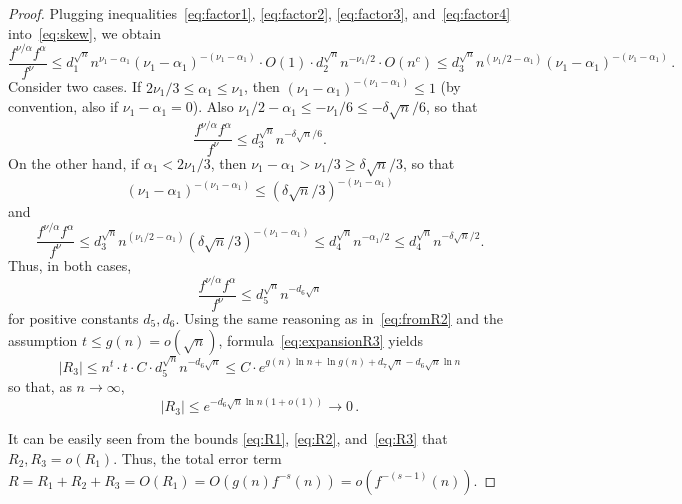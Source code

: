 \documentclass[12pt]%
{amsart}
\newcommand{\al}{{\alpha}}
\def\red#1{{\color{red}{#1}}}
\theoremstyle{plain}
\theoremstyle{definition}
\theoremstyle{remark}
\newcommand{\ve}{\varepsilon}
\begin{document}
\begin{proof}
Plugging inequalities~\eqref{eq:factor1}, \eqref{eq:factor2}, \eqref{eq:factor3}, and~\eqref{eq:factor4} into~\eqref{eq:skew}, we obtain
\[
    \frac{f^{\nu/\al} f^\al}{f^\nu}
    \le d_1^{\sqrt n}n^{\nu_1-\al_1}(\nu_1-\al_1)^{-(\nu_1-\al_1)}
    \cdot O(1) 
    \cdot d_2^{\sqrt n} n^{-\nu_1/2}
    \cdot O(n^c)
    \le d_3^{\sqrt n} n^{(\nu_1/2-\al_1)} (\nu_1-\al_1)^{-(\nu_1-\al_1)}\, .
\]
Consider two cases. 
If $2\nu_1/3\le\al_1 \le \nu_1$, then 
$(\nu_1-\al_1)^{-(\nu_1-\al_1)} \le 1$ (by convention, also if $\nu_1 - \al_1 = 0$).
Also $\nu_1/2-\al_1 \le -\nu_1/6 \le - \delta \sqrt n/6$, so that
\[
    \frac{f^{\nu/\al} f^\al}{f^\nu}
    \le d_3^{\sqrt n} n^{-\delta \sqrt n/6}.
\]
On the other hand, if $\al_1<2\nu_1/3$, then $\nu_1-\al_1 > \nu_1/3 \ge \delta \sqrt n/3$, so that
\[
    (\nu_1-\al_1)^{-(\nu_1-\al_1)}
    \le (\delta \sqrt n/3)^{-(\nu_1-\al_1)}
\]
and
\[
    \frac{f^{\nu/\al} f^\al}{f^\nu}
    \le d_3^{\sqrt n}n^{(\nu_1/2-\al_1)} (\delta \sqrt n/3)^{-(\nu_1-\al_1)}
    \le d_4^{\sqrt n} n^{-\al_1/2}
    \le d_4^{\sqrt n} n^{-\delta \sqrt n/2} .
\]
Thus, in both cases, 
\[
    \frac{f^{\nu/\al} f^\al}{f^\nu}
    \le d_5^{\sqrt n}n^{-d_6\sqrt n}
\]
for positive constants $d_5,d_6$.
Using the same reasoning as in~\eqref{eq:fromR2} and the assumption $t \le g(n) = o(\sqrt n)$, formula~\eqref{eq:expansionR3} yields
\[
    |R_3|
    \le n^t\cdot t\cdot C\cdot d_5^{\sqrt n}n^{-d_6\sqrt n}
    \le C\cdot e^{g(n)\ln n + \ln g(n) + d_7\sqrt n-d_6\sqrt n\ln n}
\]
so that, as $n\to\infty$,
\begin{equation}\label{eq:R3}
   |R_3| 
   \le e^{-d_6\sqrt n\ln n(1+o(1))}
   \to 0 \,.
\end{equation}

It can be easily seen from the bounds \eqref{eq:R1},  \eqref{eq:R2}, and~\eqref{eq:R3}
that $R_2,R_3=o(R_1)$. Thus, the total error term
$R=R_1+R_2+R_3=O(R_1)=O(g(n)f^{-s}(n))=o(f^{-(s-1)}(n))$.
\end{proof}
\end{document}
